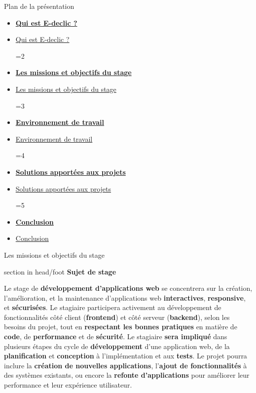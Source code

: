 \documentclass{beamer}
\newcommand{\planLine}[4]{
  \ifnum#1=#2
    \item \hyperlink{#3}{\textbf{\large #4}}
  \else
    \item \hyperlink{#3}{#4}
  \fi
}
\newcommand{\planSlide}[1]{
  	\begin{frame}{Plan de la présentation}
  		\begin{center}
  			\begin{minipage}{1\textwidth}
				\begin{itemize}
      			\planLine{#1}{1}{organisation}{Qui est E-declic ?}
      			\planLine{#1}{2}{sujet}{Les missions et objectifs du stage}
      			\planLine{#1}{3}{environnement}{Environnement de travail}
      			\planLine{#1}{4}{realisation}{Solutions apportées aux projets}
      			\planLine{#1}{5}{conclusion}{Conclusion}
	    		\end{itemize}
  		\end{minipage}
	\end{center}
	\vfill
	\end{frame}
}
\begin{document}
\planSlide{2}

\begin{frame}[label=sujet]{Les missions et objectifs du stage}

	\begin{beamercolorbox}[wd=\paperwidth,ht=1.5em,dp=0.5em,leftskip=0.5cm]{section in head/foot}
  		\large \textbf{Sujet de stage}
	\end{beamercolorbox}
	\vspace{0.2em}
	
	\begin{center}
  		\begin{minipage}{0.9\textwidth}				

    		\hspace{0.5cm} \small Le stage de \textbf{développement d'applications web} se concentrera sur la création, l'amélioration, et la maintenance d'applications web \textbf{interactives}, \textbf{responsive}, et \textbf{sécurisées}. Le stagiaire participera activement au développement de fonctionnalités côté client (\textbf{frontend}) et côté serveur (\textbf{backend}), selon les besoins du projet, tout en \textbf{respectant les bonnes pratiques} en matière de \textbf{code}, de \textbf{performance} et de \textbf{sécurité}. Le stagiaire \textbf{sera impliqué} dans plusieurs étapes du cycle de \textbf{développement} d'une application web, de la \textbf{planification} et \textbf{conception} à l'implémentation et aux \textbf{tests}. Le projet pourra inclure la \textbf{création de nouvelles applications}, l'\textbf{ajout de fonctionnalités} à des systèmes existants, ou encore la \textbf{refonte d'applications} pour améliorer leur performance et leur expérience utilisateur.
				
  		\end{minipage}
	\end{center}
	\vfill
\end{frame}
\end{document}
